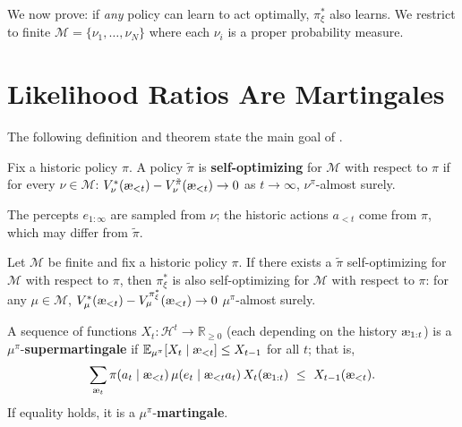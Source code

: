 \documentclass[fontsize=11pt, parskip=half]{scrartcl}
\newcommand{\cH}{\mathcal{H}}
\newcommand{\cM}{\mathcal{M}}
\newcommand{\Ex}{\mathbb{E}}
\newcommand{\aes}{\textnormal{\ae}}
\begin{document}
We now prove: if \emph{any} policy can learn to act optimally, $\pi_\xi^*$ also learns. We restrict to finite $\cM = \{\nu_1, \ldots, \nu_N\}$ where each $\nu_i$ is a proper probability measure.

\section{Likelihood Ratios Are Martingales}\label{prob:supermartingale}

The following definition and theorem state the main goal of .

\begin{definition}\label{def:selfopt}
Fix a historic policy $\pi$. A policy $\tilde\pi$ is \textbf{self-optimizing} for $\cM$ with respect to $\pi$ if for every $\nu \in \cM$:
$V_\nu^*(\aes_{<t}) - V_\nu^{\tilde\pi}(\aes_{<t}) \to 0$ as $t \to \infty$, $\nu^\pi$-almost surely.

The percepts $e_{1:\infty}$ are sampled from $\nu$; the historic actions $a_{<t}$ come from $\pi$, which may differ from $\tilde\pi$.
\end{definition}

\begin{theorem}\label{thm:selfopt}
Let $\cM$ be finite and fix a historic policy $\pi$.
If there exists a $\tilde\pi$ self-optimizing for $\cM$ with respect to $\pi$, then $\pi_\xi^*$ is also self-optimizing for $\cM$ with respect to $\pi$: for any $\mu \in \cM$,
$V_\mu^*(\aes_{<t}) - V_\mu^{\pi_\xi^*}(\aes_{<t}) \to 0$ $\mu^\pi$-almost surely.
\end{theorem}

\begin{definition}[Supermartingale]\label{def:supermartingale}
A sequence of functions $X_t : \cH^{t} \to \mathbb{R}_{\geq 0}$ (each depending on the history $\aes_{1:t}$) is a $\mu^\pi$-\textbf{supermartingale} if
$\Ex_{\mu^\pi}[X_t \mid \aes_{<t}] \leq X_{t-1}$ for all $t$; that is,
\[
    \sum_{\aes_t} \pi(a_t \mid \aes_{<t})\, \mu(e_t \mid \aes_{<t} a_t)\, X_t(\aes_{1:t}) ~\leq~ X_{t-1}(\aes_{<t}).
\]
If equality holds, it is a $\mu^\pi$-\textbf{martingale}.
\end{definition}
\end{document}
